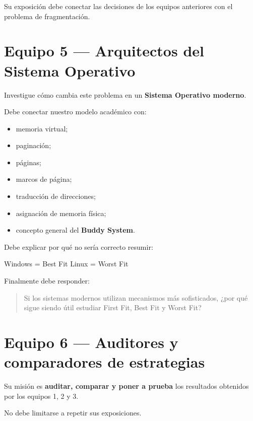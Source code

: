 \documentclass[
  spanish,
  letterpaper,
]{scrbook}
\newenvironment{Shaded}{\begin{snugshade}}{\end{snugshade}}
\newcommand{\NormalTok}[1]{\textcolor[rgb]{0.00,0.23,0.31}{#1}}
\providecommand{\tightlist}{%
  \setlength{\itemsep}{0pt}\setlength{\parskip}{0pt}}
\begin{document}
Su exposición debe conectar las decisiones de los equipos anteriores con
el problema de fragmentación.

\section{Equipo 5 --- Arquitectos del Sistema
Operativo}\label{equipo-5-arquitectos-del-sistema-operativo}

Investigue cómo cambia este problema en un \textbf{Sistema Operativo
moderno}.

Debe conectar nuestro modelo académico con:

\begin{itemize}
\tightlist
\item
  memoria virtual;
\item
  paginación;
\item
  páginas;
\item
  marcos de página;
\item
  traducción de direcciones;
\item
  asignación de memoria física;
\item
  concepto general del \textbf{Buddy System}.
\end{itemize}

Debe explicar por qué no sería correcto resumir:

\begin{Shaded}
\begin{Highlighting}[]
\NormalTok{Windows = Best Fit}
\NormalTok{Linux   = Worst Fit}
\end{Highlighting}
\end{Shaded}

Finalmente debe responder:

\begin{quote}
Si los sistemas modernos utilizan mecanismos más sofisticados, ¿por qué
sigue siendo útil estudiar First Fit, Best Fit y Worst Fit?
\end{quote}

\section{Equipo 6 --- Auditores y comparadores de
estrategias}\label{equipo-6-auditores-y-comparadores-de-estrategias}

Su misión es \textbf{auditar, comparar y poner a prueba} los resultados
obtenidos por los equipos 1, 2 y 3.

No debe limitarse a repetir sus exposiciones.
\end{document}
